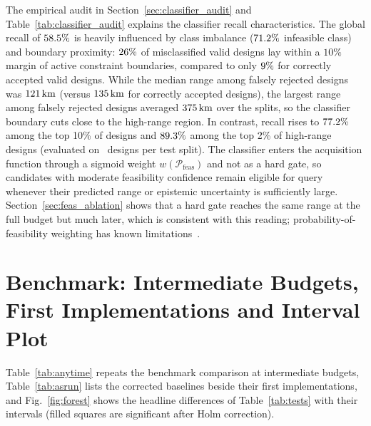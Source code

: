 The empirical audit in Section~\ref{sec:classifier_audit} and Table~\ref{tab:classifier_audit} explains the classifier recall characteristics. The global recall of $58.5\%$ is heavily influenced by class imbalance ($71.2\%$ infeasible class) and boundary proximity: $26\%$ of misclassified valid designs lay within a $10\%$ margin of active constraint boundaries, compared to only $9\%$ for correctly accepted valid designs. While the median range among falsely rejected designs was $121\,\mathrm{km}$ (versus $135\,\mathrm{km}$ for correctly accepted designs), the largest range among falsely rejected designs averaged $375\,\mathrm{km}$ over the splits, so the classifier boundary cuts close to the high-range region. In contrast, recall rises to \textbf{$77.2\%$} among the top 10\% of designs and \textbf{$89.3\%$} among the top 2\% of high-range designs (evaluated on \NfnTwoN\ designs per test split). The classifier enters the acquisition function through a sigmoid weight $w(\mathcal{P}_{\mathrm{feas}})$ and not as a hard gate, so candidates with moderate feasibility confidence remain eligible for query whenever their predicted range or epistemic uncertainty is sufficiently large. Section~\ref{sec:feas_ablation} shows that a hard gate reaches the same range at the full budget but much later, which is consistent with this reading; probability-of-feasibility weighting has known limitations~\cite{cordelier2026multifidelity}.



\section{Benchmark: Intermediate Budgets, First Implementations and Interval Plot}
\label{sec:supp_benchmark}
Table~\ref{tab:anytime} repeats the benchmark comparison at intermediate budgets, Table~\ref{tab:asrun} lists the corrected baselines beside their first implementations, and Fig.~\ref{fig:forest} shows the headline differences of Table~\ref{tab:tests} with their intervals (filled squares are significant after Holm correction).

\begin{table}[htbp]
\centering\small
\caption{Mean running best feasible range (km, $\pm$ sd over seeds, pool included) at intermediate budgets, and differences between strategies with two-sided Welch $p$-values (not corrected for multiplicity).}
\label{tab:anytime}
\resizebox{\linewidth}{!}{%

}
\end{table}

